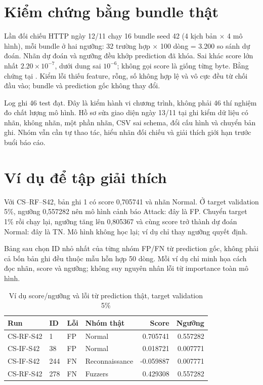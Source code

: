 \section{Kiểm chứng bằng bundle thật}
Lần đối chiếu HTTP ngày 12/11 chạy 16 bundle seed 42 (4 kịch bản $\times$ 4 mô hình), mỗi bundle ở hai ngưỡng: 32 trường hợp $\times$ 100 dòng = 3.200 so sánh dự đoán. Nhãn dự đoán và ngưỡng đều khớp prediction đã khóa. Sai khác score lớn nhất $2.20\times10^{-7}$, dưới dung sai $10^{-6}$; không gọi score là giống từng byte. Bằng chứng tại . Kiểm lỗi thiếu feature, rỗng, số không hợp lệ và vô cực đều từ chối đầu vào; bundle và prediction gốc không thay đổi.

Log  ghi 46 test đạt. Đây là kiểm hành vi chương trình, không phải 46 thí nghiệm đo chất lượng mô hình. Hồ sơ sửa giao diện ngày 13/11 tại  ghi kiểm dữ liệu có nhãn, không nhãn, một phần nhãn, CSV sai schema, đổi cấu hình và chuyển bản ghi. Nhóm vẫn cần tự thao tác, hiểu nhãn đối chiếu và giải thích giới hạn trước buổi báo cáo.

\section{Ví dụ để tập giải thích}
Với CS--RF--S42, bản ghi 1 có score 0,705741 và nhãn Normal. Ở target validation 5\%, ngưỡng 0,557282 nên mô hình cảnh báo Attack: đây là FP. Chuyển target 1\% rồi chạy lại, ngưỡng tăng lên 0,805367 và cùng score trở thành dự đoán Normal: đây là TN. Mô hình không học lại; ví dụ chỉ thay ngưỡng quyết định.

Bảng sau chọn ID nhỏ nhất của từng nhóm FP/FN từ prediction gốc, không phải cả bốn bản ghi đều thuộc mẫu hỗn hợp 50 dòng. Mỗi ví dụ chỉ minh họa cách đọc nhãn, score và ngưỡng; không suy nguyên nhân lỗi từ importance toàn mô hình.
\begin{table}[H]\centering\small
\caption{Ví dụ score/ngưỡng và lỗi từ prediction thật, target validation 5\%}
\begin{tabular}{L{2.7cm}L{.7cm}L{.7cm}L{3cm}rr}\toprule Run & ID & Lỗi & Nhóm thật & Score & Ngưỡng\\\midrule
CS-RF-S42 & 1 & FP & Normal & 0.705741 & 0.557282\\
CS-IF-S42 & 38 & FP & Normal & 0.018721 & 0.007771\\
CS-IF-S42 & 244 & FN & Reconnaissance & -0.059887 & 0.007771\\
CS-RF-S42 & 278 & FN & Fuzzers & 0.429308 & 0.557282\\
\bottomrule\end{tabular}\end{table}

